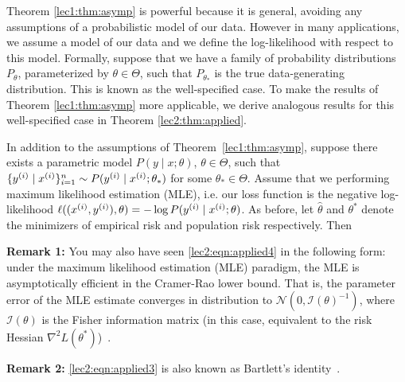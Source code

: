 
Theorem \ref{lec1:thm:asymp} is powerful because it is general, avoiding any assumptions of a probabilistic model of our data. However in many applications, we assume a model of our data and we define the log-likelihood with respect to this model. Formally, suppose that we have a family of probability distributions $P_\theta$, parameterized by $\theta \in \Theta$, such that $P_{\theta_*}$ is the true data-generating distribution. This is known as the well-specified case. To make the results of Theorem \ref{lec1:thm:asymp} more applicable, we derive analogous results for this well-specified case in Theorem \ref{lec2:thm:applied}.

\begin{theorem}
\label{lec2:thm:applied}
    In addition to the assumptions of Theorem~\ref{lec1:thm:asymp}, suppose there exists a parametric model $P(y \mid x; \theta)$, $\theta \in \Theta$, such that $\{ y\sp{i} \mid x\sp{i} \}_{i=1}^n \sim P( y\sp{i} \mid x\sp{i} ; \theta_*)$ for some $\theta_* \in \Theta$. Assume that we performing maximum likelihood estimation (MLE), i.e. our loss function is the negative log-likelihood $\ell((x\sp{i}, y\sp{i}), \theta) = - \log P( y\sp{i} \mid x\sp{i} ; \theta)$. As before, let $\hat\theta$ and $\theta^*$ denote the minimizers of empirical risk and population risk respectively. Then
    \al{
    \label{lec2:eqn:applied1}
        \theta^* = \theta_*,
    }
\end{theorem}

\textbf{Remark 1:} You may also have seen \eqref{lec2:eqn:applied4} in the following form: under the maximum likelihood estimation (MLE) paradigm, the MLE is asymptotically efficient in the Cramer-Rao lower bound. That is, the parameter error of the MLE estimate converges in distribution to $\mathcal{N}(0, \mathcal{I}(\theta)^{-1})$, where $\mathcal{I}(\theta)$ is the Fisher information matrix (in this case, equivalent to the risk Hessian $\nabla^2 L(\theta^*)$)~\cite{rice2006mathematical}.

\textbf{Remark 2:} \eqref{lec2:eqn:applied3} is also known as Bartlett's identity~\cite{percynotes}.

